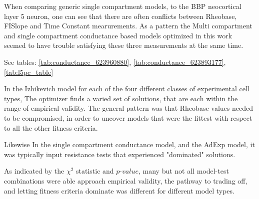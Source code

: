 When comparing generic single compartment models, to the BBP neocortical layer 5 neuron, one can see that there are often conflicts between Rheobase, FISlope and Time Constant mearurements. As a pattern the Multi compartment and single compartment conductance based models optimized in this work seemed to have trouble satisfying these three measurements at the same time.

See tables: \ref{tab:conductance_623960880}, \ref{tab:conductance_623893177}, \ref{tab:l5pc_table}





In the Izhikevich model for each of the four different classes of experimental cell types, The optimizer finds a varied set of solutions, that are each within the range of empirical validity. The general pattern was that Rheobase values needed to be compromised, in order to uncover models that were the fittest with respect to all the other fitness criteria.

Likewise In the single compartment conductance model, and the AdExp model, it was typically input resistance tests that experienced "dominated" solutions. 

As indicated by the $\chi^{2}$ statistic and $p$-$value$, many but not all model-test combinations were able approach empirical validity, the pathway to trading off, and letting fitness criteria dominate was different for different model types.

\begin{comment}

\begin{table}[]
    \centering
    \begin{tabular}{c|c|c}
        
        AHP-depth-abs & $3.0 \times $ & 1 
        sag-ratio2 & $3.0 \times $ & 1 ohmic-input-resistance & $1.5 \times $ & 1
        peak-voltage & $3.0 \times $ & 1
        voltage-base & $3.0 \times $ & 1
        Spikecount & $3.0 \times $ & 1
        ohmic-input-resistance-vb-ssse & $1.5 \times $ & 1
    \end{tabular}
    \caption{Caption}
    \label{tab:my_label}
\end{table}
\end{comment}


